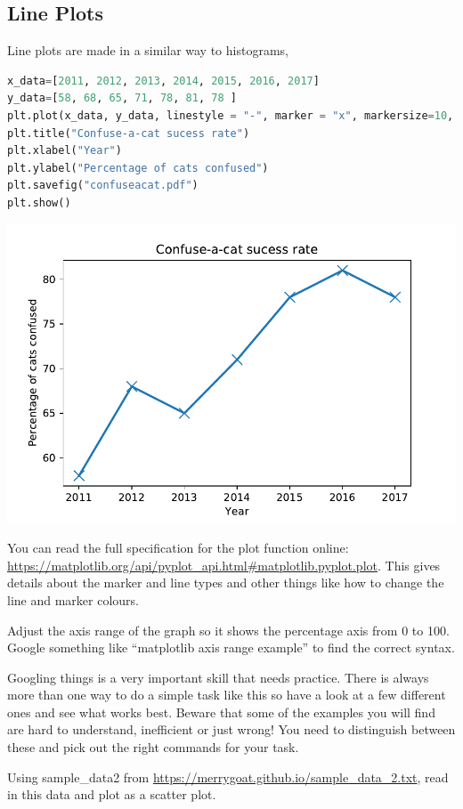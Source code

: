 	\subsection{Line Plots}
		Line plots are made in a similar way to histograms,
		\begin{lstlisting}[language=Python]
x_data=[2011, 2012, 2013, 2014, 2015, 2016, 2017]
y_data=[58, 68, 65, 71, 78, 81, 78 ]
plt.plot(x_data, y_data, linestyle = "-", marker = "x", markersize=10, linewidth=2)
plt.title("Confuse-a-cat sucess rate")
plt.xlabel("Year")
plt.ylabel("Percentage of cats confused")
plt.savefig("confuseacat.pdf")
plt.show()\end{lstlisting}
		\includegraphics[scale=0.75]{images/confuseacat}

You can read the full specification for the plot function online: \url{https://matplotlib.org/api/pyplot_api.html#matplotlib.pyplot.plot}. This gives details about the marker and line types and other things like how to change the line and marker colours.
\begin{task}Adjust the axis range of the graph so it shows the percentage axis from 0 to 100. Google something like ``matplotlib axis range example'' to find the correct syntax.\end{task}
Googling things is a very important skill that needs practice. There is always more than one way to do a simple task like this so have a look at a few different ones and see what works best. Beware that some of the examples you will find are hard to understand, inefficient or just wrong! You need to distinguish between these and pick out the right commands for your task.
\begin{task}Using sample\_data2 from \url{https://merrygoat.github.io/sample_data_2.txt}, read in this data and plot as a scatter plot.\end{task}

